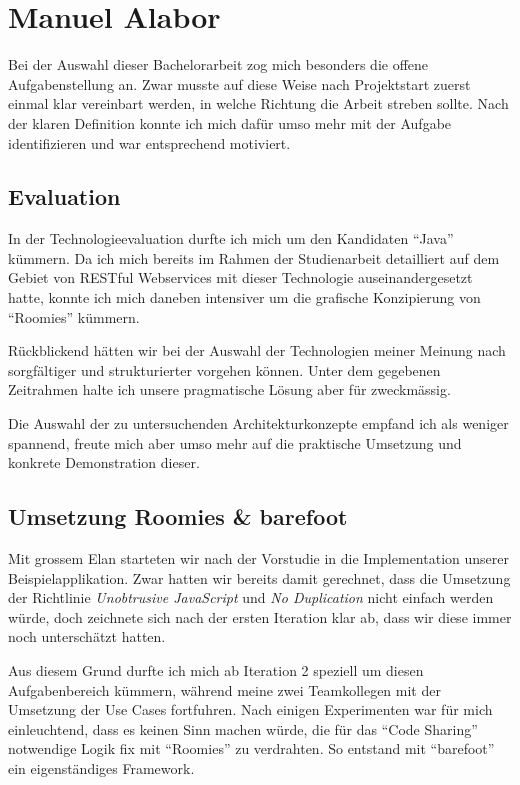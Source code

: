 \section{Manuel Alabor}

Bei der Auswahl dieser Bachelorarbeit zog mich besonders die offene Aufgabenstellung an. Zwar musste auf diese Weise nach Projektstart zuerst einmal klar vereinbart werden, in welche Richtung die Arbeit streben sollte. Nach der klaren Definition konnte ich mich dafür umso mehr mit der Aufgabe identifizieren und war entsprechend motiviert.

\subsection*{Evaluation}

In der Technologieevaluation durfte ich mich um den Kandidaten ``Java'' kümmern. Da ich mich bereits im Rahmen der Studienarbeit detailliert auf dem Gebiet von RESTful Webservices mit dieser Technologie auseinandergesetzt hatte, konnte ich mich daneben intensiver um die grafische Konzipierung von ``Roomies'' kümmern.

Rückblickend hätten wir bei der Auswahl der Technologien meiner Meinung nach sorgfältiger und strukturierter vorgehen können. Unter dem gegebenen Zeitrahmen halte ich unsere pragmatische Lösung aber für zweckmässig.

Die Auswahl der zu untersuchenden Architekturkonzepte empfand ich als weniger spannend, freute mich aber umso mehr auf die praktische Umsetzung und konkrete Demonstration dieser.


\subsection*{Umsetzung Roomies \& barefoot}

Mit grossem Elan starteten wir nach der Vorstudie in die Implementation unserer Beispielapplikation. Zwar hatten wir bereits damit gerechnet, dass die Umsetzung der Richtlinie \emph{Unobtrusive JavaScript} und \emph{No Duplication} nicht einfach werden würde, doch zeichnete sich nach der ersten Iteration klar ab, dass wir diese immer noch unterschätzt hatten.

Aus diesem Grund durfte ich mich ab Iteration 2 speziell um diesen Aufgabenbereich kümmern, während meine zwei Teamkollegen mit der Umsetzung der Use Cases fortfuhren. Nach einigen Experimenten war für mich einleuchtend, dass es keinen Sinn machen würde, die für das ``Code Sharing'' notwendige Logik fix mit ``Roomies'' zu verdrahten. So entstand mit ``barefoot'' ein eigenständiges Framework.

